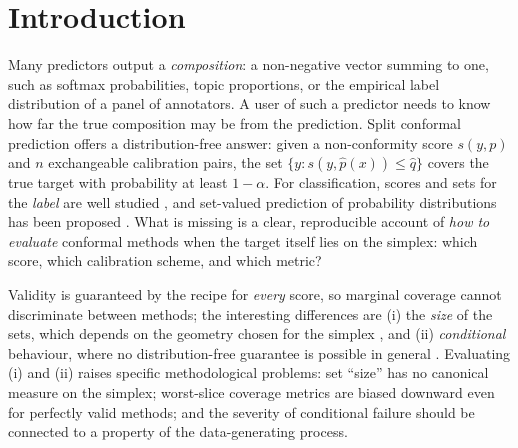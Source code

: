 \section{Introduction}
Many predictors output a \emph{composition}: a non-negative vector summing to one, such as softmax probabilities, topic proportions, or the empirical label distribution of a panel of annotators. A user of such a predictor needs to know how far the true composition may be from the prediction. Split conformal prediction \citep{vovk2005algorithmic,papadopoulos2002inductive,lei2018distribution} offers a distribution-free answer: given a non-conformity score $s(y,p)$ and $n$ exchangeable calibration pairs, the set $\{y: s(y,\hat p(x))\le \hat q\}$ covers the true target with probability at least $1-\alpha$. For classification, scores and sets for the \emph{label} are well studied \citep{sadinle2019least,romano2020classification,angelopoulos2021uncertainty,ding2023class}, and set-valued prediction of probability distributions has been proposed \citep{javanmardi2024conformalized}. What is missing is a clear, reproducible account of \emph{how to evaluate} conformal methods when the target itself lies on the simplex: which score, which calibration scheme, and which metric?

Validity is guaranteed by the recipe for \emph{every} score, so marginal coverage cannot discriminate between methods; the interesting differences are (i) the \emph{size} of the sets, which depends on the geometry chosen for the simplex \citep{aitchison1982statistical}, and (ii) \emph{conditional} behaviour, where no distribution-free guarantee is possible in general \citep{vovk2012conditional,barber2021limits}. Evaluating (i) and (ii) raises specific methodological problems: set ``size'' has no canonical measure on the simplex; worst-slice coverage metrics are biased downward even for perfectly valid methods; and the severity of conditional failure should be connected to a property of the data-generating process.

